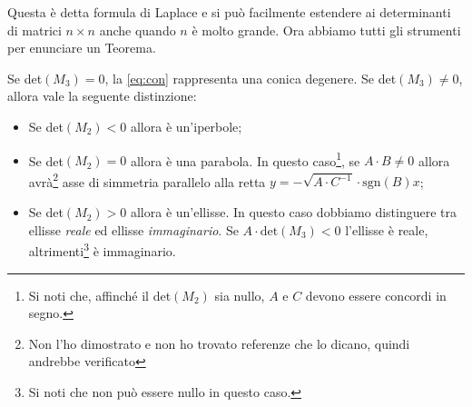 \documentclass[a4paper, oneside]{article}
\begin{document}
		Questa è detta formula di Laplace e si può facilmente estendere ai determinanti di matrici $n\times n$ anche quando $n$ è molto grande.
		Ora abbiamo tutti gli strumenti per enunciare un Teorema.
		\begin{teo} \phantom{AB} \newline
			Se det$(M_3) = 0$, la \eqref{eq:con} rappresenta una conica degenere. \newline
			Se det$(M_3) \neq 0$, allora vale la seguente distinzione:
			\begin{itemize}
				\item Se det$(M_2) < 0$ allora è un'iperbole;
				\item Se det$(M_2) = 0$ allora è una parabola. In questo caso\footnote{Si noti che, affinché il det$(M_2)$ sia nullo, $A$ e $C$ devono essere concordi in segno.}, se $A\cdot B \neq 0$ allora avrà\footnote{Non l'ho dimostrato e non ho trovato referenze che lo dicano, quindi andrebbe verificato} asse di simmetria parallelo alla retta $\displaystyle y= -\sqrt{A\cdot C^{-1}}\cdot \mathrm{sgn}(B)x$;
				\item Se det$(M_2) > 0$ allora è un'ellisse. In questo caso dobbiamo distinguere tra ellisse \emph{reale} ed ellisse \emph{immaginario}. Se $A\cdot\mathrm{det}(M_3) < 0$ l'ellisse è reale, altrimenti\footnote{Si noti che non può essere nullo in questo caso.} è immaginario.
			\end{itemize}
		\end{teo}
\end{document}
